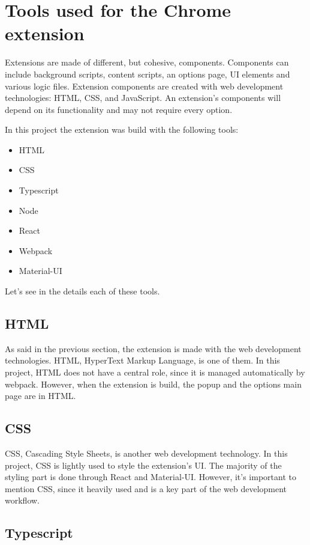 \section{Tools used for the Chrome extension}

Extensions are made of different, but cohesive, components. Components can include background scripts, content scripts, an options page, UI elements and various logic files. Extension components are created with web development technologies: HTML, CSS, and JavaScript. An extension's components will depend on its functionality and may not require every option.

In this project the extension was build with the following tools:

\begin{itemize}
    \item HTML
    \item CSS
    \item Typescript
    \item Node
    \item React
    \item Webpack
    \item Material-UI
\end{itemize}

Let's see in the details each of these tools.

\subsection {HTML}

As said in the previous section, the extension is made with the web development technologies. HTML, HyperText Markup Language, is one of them.
In this project, HTML does not have a central role, since it is managed automatically by webpack. However, when the extension is build, the popup and the options main page are in HTML.

\subsection {CSS}

CSS, Cascading Style Sheets, is another web development technology. In this project, CSS is lightly used to style the extension's UI. The majority of the styling part is done through React and Material-UI. However, it's important to mention CSS, since it heavily used and is a key part of the web development workflow.

\subsection {Typescript}

